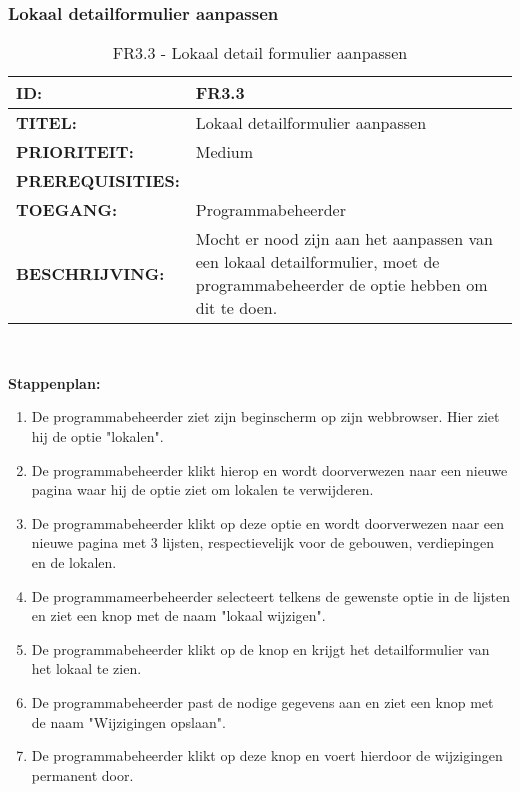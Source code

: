 \subsubsection{Lokaal detailformulier aanpassen} 
\noindent\begin{table}[H]
            \begin{tabular}{l | p{10cm}}
                \textbf{ID:} & FR3.3 \\ \hline
                \textbf{TITEL:} & Lokaal detailformulier aanpassen\\ \hline
                \textbf{PRIORITEIT:} &  Medium \\ \hline
                \textbf{PREREQUISITIES:} & \\ \hline
                \textbf{TOEGANG:} & Programmabeheerder \\ \hline
                \textbf{BESCHRIJVING:} & Mocht er nood zijn aan het aanpassen van een lokaal detailformulier, moet de programmabeheerder de optie hebben om dit te doen.\\ 
            \end{tabular}\\
            \caption{FR3.3 - Lokaal detail formulier aanpassen}
            \label{tab:FR3.3 - Lokaal detailformulier aanpassen}
        \end{table}
        
\textbf{Stappenplan:}
\begin{enumerate}
\item De programmabeheerder ziet zijn beginscherm op zijn webbrowser. Hier ziet hij de optie "lokalen".
\item De programmabeheerder klikt hierop en wordt doorverwezen naar een nieuwe pagina waar hij de optie ziet om lokalen te verwijderen.
\item De programmabeheerder klikt op deze optie en wordt doorverwezen naar een nieuwe pagina met 3 lijsten, respectievelijk voor de gebouwen, verdiepingen en de lokalen.
\item De programmameerbeheerder selecteert telkens de gewenste optie in de lijsten en ziet een knop met de naam "lokaal wijzigen".
\item De programmabeheerder klikt op de knop en krijgt het detailformulier van het lokaal te zien.
\item De programmabeheerder past de nodige gegevens aan en ziet een knop met de naam "Wijzigingen opslaan".
\item De programmabeheerder klikt op deze knop en voert hierdoor de wijzigingen permanent door.
\end{enumerate}


